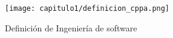 
\begin{figure}[h!] \centering
\texttt{[image: capitulo1/definicion\_cppa.png]} 
\caption{Definici\'on de Ingenier\'ia de software}
\label{figuragoogle}
\end{figure}

